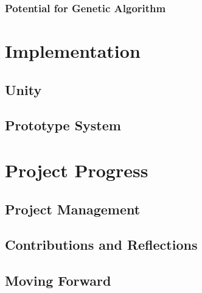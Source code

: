 \documentclass{sig-alternate-05-2015}
\begin{document}
\subsubsection{Potential for Genetic Algorithm}

\section{Implementation}
\subsection{Unity}
\subsection{Prototype System}

\section{Project Progress}
\subsection{Project Management}
\subsection{Contributions and Reflections}
\subsection{Moving Forward}

\newpage
{}
\end{document}
